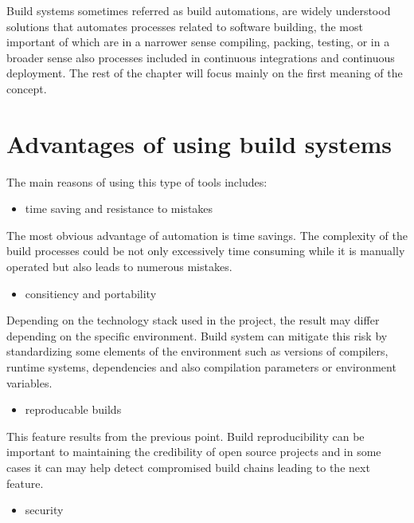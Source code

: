 Build systems sometimes referred as build automations, are widely
understood solutions that automates processes related to software
building, the most important of which are in a narrower sense compiling,
packing, testing, or in a broader sense also processes included in
continuous integrations and continuous deployment. The rest of the
chapter will focus mainly on the first meaning of the concept.

\hypertarget{advantages-of-using-build-systems}{%
\section{Advantages of using build
systems}\label{advantages-of-using-build-systems}}

The main reasons of using this type of tools includes:

\begin{itemize}
\tightlist
\item
  time saving and resistance to mistakes
\end{itemize}

The most obvious advantage of automation is time savings. The complexity
of the build processes could be not only excessively time consuming
while it is manually operated but also leads to numerous mistakes.

\begin{itemize}
\tightlist
\item
  consitiency and portability
\end{itemize}

Depending on the technology stack used in the project, the result may
differ depending on the specific environment. Build system can mitigate
this risk by standardizing some elements of the environment such as
versions of compilers, runtime systems, dependencies and also
compilation parameters or environment variables.

\begin{itemize}
\tightlist
\item
  reproducable builds
\end{itemize}

This feature results from the previous point. Build reproducibility can
be important to maintaining the credibility of open source projects and
in some cases it can may help detect compromised build chains leading to
the next feature.

\begin{itemize}
\tightlist
\item
  security
\end{itemize}

